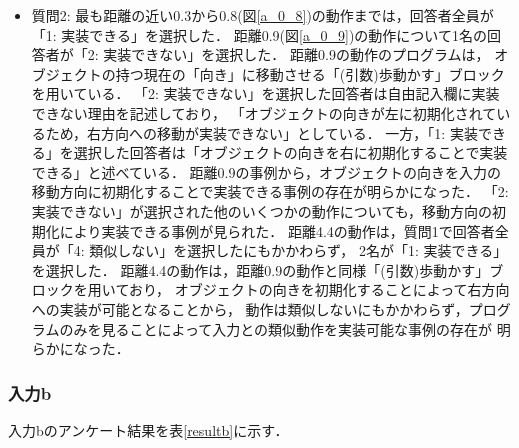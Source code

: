 \documentclass[11pt]{jreport}
\begin{document}
\begin{itemize}
    \item 質問2: 最も距離の近い0.3から0.8(図\ref{a_0_8})の動作までは，回答者全員が「1: 実装できる」を選択した．
    距離0.9(図\ref{a_0_9})の動作について1名の回答者が「2: 実装できない」を選択した．
    距離0.9の動作のプログラムは，
    オブジェクトの持つ現在の「向き」に移動させる「(引数)歩動かす」ブロックを用いている．
    「2: 実装できない」を選択した回答者は自由記入欄に実装できない理由を記述しており，
    「オブジェクトの向きが左に初期化されているため，右方向への移動が実装できない」としている．
    一方，「1: 実装できる」を選択した回答者は「オブジェクトの向きを右に初期化することで実装できる」と述べている．
    距離0.9の事例から，オブジェクトの向きを入力の移動方向に初期化することで実装できる事例の存在が明らかになった．
    「2: 実装できない」が選択された他のいくつかの動作についても，移動方向の初期化により実装できる事例が見られた．
    距離4.4の動作は，質問1で回答者全員が「4: 類似しない」を選択したにもかかわらず，
    2名が「1: 実装できる」を選択した．
    距離4.4の動作は，距離0.9の動作と同様「(引数)歩動かす」ブロックを用いており，
    オブジェクトの向きを初期化することによって右方向への実装が可能となることから，
    動作は類似しないにもかかわらず，プログラムのみを見ることによって入力との類似動作を実装可能な事例の存在が
    明らかになった．
\end{itemize}

\subsubsection{入力b}
入力bのアンケート結果を表\ref{resultb}に示す．
\end{document}
